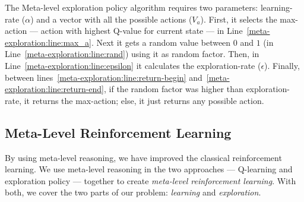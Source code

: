The Meta-level exploration policy algorithm requires two parameters: learning-rate ($\alpha$) and a vector with all the possible actions ($V_a$).
First, it selects the max-action --- action with highest Q-value for current state --- in Line~\ref{meta-exploration:line:max_a}.
Next it gets a random value between $0$ and $1$ (in Line~\ref{meta-exploration:line:rand}) using it as random factor.
Then, in Line~\ref{meta-exploration:line:epsilon} it calculates the exploration-rate ($\epsilon$).
Finally, between lines~\ref{meta-exploration:line:return-begin} and~\ref{meta-exploration:line:return-end}, if the random factor was higher than exploration-rate, it returns the max-action; else, it just returns any possible action.



\subsection{Meta-Level Reinforcement Learning}
\label{subsec:mlrl}

By using meta-level reasoning, we have improved the classical reinforcement learning.
We use meta-level reasoning in the two approaches --- Q-learning and exploration policy --- together to create \textit{meta-level reinforcement learning}.
With both, we cover the two parts of our problem: \textit{learning} and \textit{exploration}.